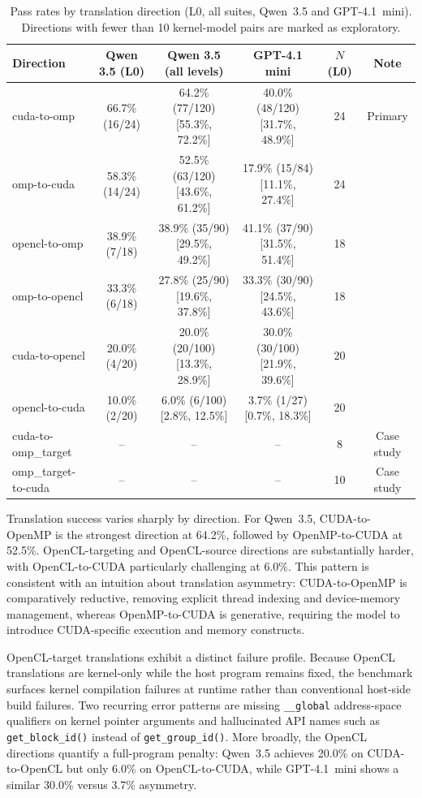 \begin{table}[t]
\centering
\caption{Pass rates by translation direction (L0, all suites, Qwen~3.5 and GPT-4.1~mini). Directions with fewer than 10 kernel-model pairs are marked as exploratory.}
\label{tab:direction-rates}
\small
\begin{tabular}{@{}lccccc@{}}
\toprule
Direction & Qwen 3.5 (L0) & Qwen 3.5 (all levels) & GPT-4.1 mini & $N$ (L0) & Note \\
\midrule
cuda-to-omp & 66.7\% (16/24) & 64.2\% (77/120) [55.3\%, 72.2\%] & 40.0\% (48/120) [31.7\%, 48.9\%] & 24 & Primary \\
omp-to-cuda & 58.3\% (14/24) & 52.5\% (63/120) [43.6\%, 61.2\%] & 17.9\% (15/84) [11.1\%, 27.4\%] & 24 & \\
opencl-to-omp & 38.9\% (7/18) & 38.9\% (35/90) [29.5\%, 49.2\%] & 41.1\% (37/90) [31.5\%, 51.4\%] & 18 & \\
omp-to-opencl & 33.3\% (6/18) & 27.8\% (25/90) [19.6\%, 37.8\%] & 33.3\% (30/90) [24.5\%, 43.6\%] & 18 & \\
cuda-to-opencl & 20.0\% (4/20) & 20.0\% (20/100) [13.3\%, 28.9\%] & 30.0\% (30/100) [21.9\%, 39.6\%] & 20 & \\
opencl-to-cuda & 10.0\% (2/20) & 6.0\% (6/100) [2.8\%, 12.5\%] & 3.7\% (1/27) [0.7\%, 18.3\%] & 20 & \\
cuda-to-omp\_target & -- & -- & -- & 8 & Case study \\
omp\_target-to-cuda & -- & -- & -- & 10 & Case study \\
\bottomrule
\end{tabular}
\end{table}

Translation success varies sharply by direction. For Qwen~3.5, CUDA-to-OpenMP is the strongest direction at 64.2\%, followed by OpenMP-to-CUDA at 52.5\%. OpenCL-targeting and OpenCL-source directions are substantially harder, with OpenCL-to-CUDA particularly challenging at 6.0\%. This pattern is consistent with an intuition about translation asymmetry: CUDA-to-OpenMP is comparatively reductive, removing explicit thread indexing and device-memory management, whereas OpenMP-to-CUDA is generative, requiring the model to introduce CUDA-specific execution and memory constructs.

OpenCL-target translations exhibit a distinct failure profile. Because OpenCL translations are kernel-only while the host program remains fixed, the benchmark surfaces kernel compilation failures at runtime rather than conventional host-side build failures. Two recurring error patterns are missing \texttt{\_\_global} address-space qualifiers on kernel pointer arguments and hallucinated API names such as \texttt{get\_block\_id()} instead of \texttt{get\_group\_id()}. More broadly, the OpenCL directions quantify a full-program penalty: Qwen~3.5 achieves 20.0\% on CUDA-to-OpenCL but only 6.0\% on OpenCL-to-CUDA, while GPT-4.1~mini shows a similar 30.0\% versus 3.7\% asymmetry.

